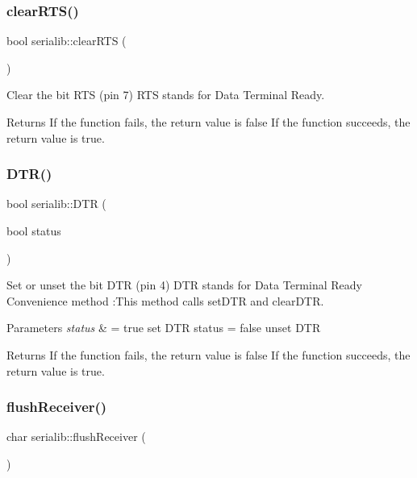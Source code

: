 \subsubsection{\texorpdfstring{clear\+R\+T\+S()}{clearRTS()}}
{\footnotesize\ttfamily bool serialib\+::clear\+R\+TS (\begin{DoxyParamCaption}{ }\end{DoxyParamCaption})}



Clear the bit R\+TS (pin 7) R\+TS stands for Data Terminal Ready. 

\begin{DoxyReturn}{Returns}
If the function fails, the return value is false If the function succeeds, the return value is true. 
\end{DoxyReturn}
\mbox{\label{classserialib_a3dc0ec56e84ab2b43dc02fc2e02148a1}} 
\subsubsection{\texorpdfstring{D\+T\+R()}{DTR()}}
{\footnotesize\ttfamily bool serialib\+::\+D\+TR (\begin{DoxyParamCaption}\item[{bool}]{status }\end{DoxyParamCaption})}



Set or unset the bit D\+TR (pin 4) D\+TR stands for Data Terminal Ready Convenience method \+:This method calls set\+D\+TR and clear\+D\+TR. 


\begin{DoxyParams}{Parameters}
{\em status} & = true set D\+TR status = false unset D\+TR \\
\hline
\end{DoxyParams}
\begin{DoxyReturn}{Returns}
If the function fails, the return value is false If the function succeeds, the return value is true. 
\end{DoxyReturn}
\mbox{\label{classserialib_a572dd8d208511ec81d848de72cb05c7a}} 
\subsubsection{\texorpdfstring{flush\+Receiver()}{flushReceiver()}}
{\footnotesize\ttfamily char serialib\+::flush\+Receiver (\begin{DoxyParamCaption}{ }\end{DoxyParamCaption})}



